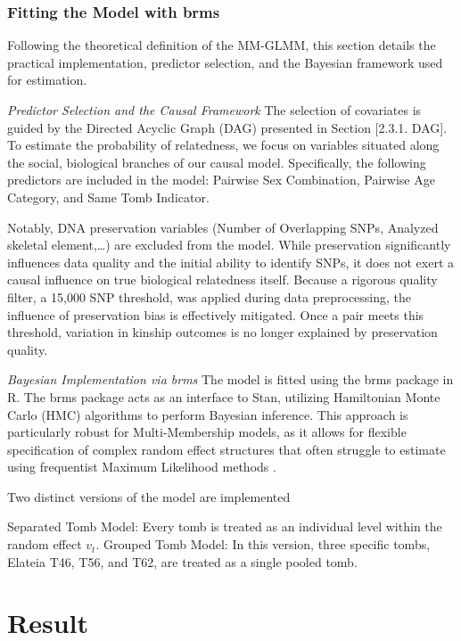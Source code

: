 \documentclass[
]{ajs}
\begin{document}
\subsubsection{Fitting the Model with
brms}\label{fitting-the-model-with-brms}

Following the theoretical definition of the MM-GLMM, this section
details the practical implementation, predictor selection, and the
Bayesian framework used for estimation.

\emph{Predictor Selection and the Causal Framework} The selection of
covariates is guided by the Directed Acyclic Graph (DAG) presented in
Section {[}2.3.1. DAG{]}. To estimate the probability of relatedness, we
focus on variables situated along the social, biological branches of our
causal model. Specifically, the following predictors are included in the
model: Pairwise Sex Combination, Pairwise Age Category, and Same Tomb
Indicator.

Notably, DNA preservation variables (Number of Overlapping SNPs,
Analyzed skeletal element,\ldots) are excluded from the model. While
preservation significantly influences data quality and the initial
ability to identify SNPs, it does not exert a causal influence on true
biological relatedness itself. Because a rigorous quality filter, a
15,000 SNP threshold, was applied during data preprocessing, the
influence of preservation bias is effectively mitigated. Once a pair
meets this threshold, variation in kinship outcomes is no longer
explained by preservation quality.

\emph{Bayesian Implementation via brms} The model is fitted using the
brms package in R. The brms package acts as an interface to Stan,
utilizing Hamiltonian Monte Carlo (HMC) algorithms to perform Bayesian
inference. This approach is particularly robust for Multi-Membership
models, as it allows for flexible specification of complex random effect
structures that often struggle to estimate using frequentist Maximum
Likelihood methods \citet{burkner2017advanced}.

Two distinct versions of the model are implemented

Separated Tomb Model: Every tomb is treated as an individual level
within the random effect \(v_t\). Grouped Tomb Model: In this version,
three specific tombs, Elateia T46, T56, and T62, are treated as a single
pooled tomb.

\section{Result}\label{result}
\end{document}
